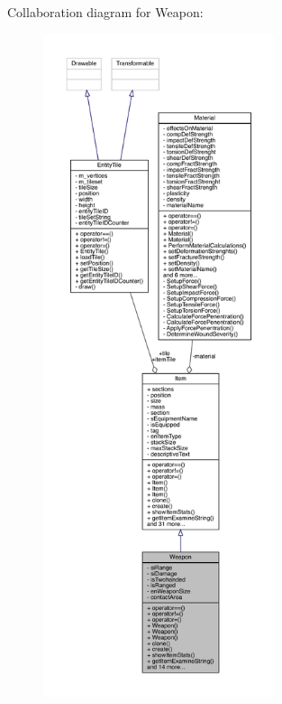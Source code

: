 Collaboration diagram for Weapon\+:
\nopagebreak
\begin{figure}[H]
\begin{center}
\leavevmode
\includegraphics[height=550pt]{d5/d2f/class_weapon__coll__graph}
\end{center}
\end{figure}
